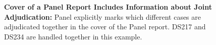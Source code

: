 \begin{figure}[t!]
  \centering
  \caption{\textbf{Cover of a Panel Report Includes Information about Joint Adjudication:}
      Panel explicitly marks which different cases are adjudicated together in the cover of the Panel report. DS217 and DS234 are handled together in this example.
      }
  \label{fig:linked-cases}
\end{figure}
 
 
 

